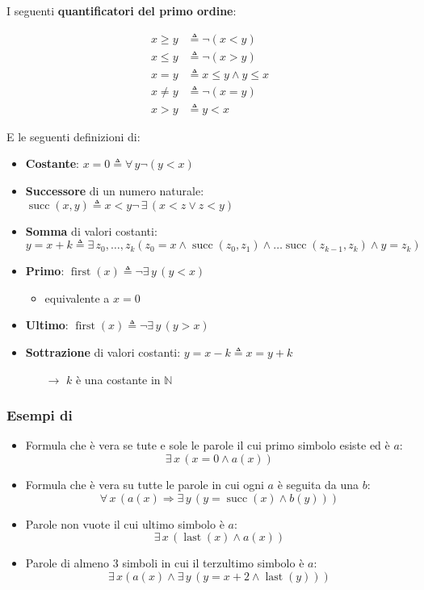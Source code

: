 \documentclass[italian, 10pt]{article}
\DeclareMathOperator{\succop}{succ}
\DeclareMathOperator{\lastop}{last}
\DeclareMathOperator{\firstop}{first}
\begin{document}
I seguenti \textbf{quantificatori del primo ordine}:

\begin{align*}
  x \geq y & \triangleq \lnot (x < y)           \\
  x \leq y & \triangleq \lnot (x > y)           \\
  x = y    & \triangleq x \leq y \land y \leq x \\
  x \neq y & \triangleq \lnot (x = y)           \\
  x > y    & \triangleq y < x
\end{align*}

E le seguenti definizioni di:

\begin{itemize}
  \item \textbf{Costante}: \(x = 0 \triangleq \forall \, y \lnot (y < x)\)
  \item \textbf{Successore} di un numero naturale: \(\succop(x, y) \triangleq x < y \lnot \, \exists \, (x < z \lor z < y)\)
  \item \textbf{Somma} di valori costanti: \(y = x + k \triangleq \exists \, z_0, \ldots, z_k (z_0 = x \land \succop (z_0, z_1) \land \ldots \succop (z_{k-1}, z_k) \land y = z_k) \)
  \item \textbf{Primo}: \(\firstop(x) \triangleq \lnot \exists \, y \, (y < x)\)
        \begin{itemize}
          \item equivalente a \(x = 0\)
        \end{itemize}
  \item \textbf{Ultimo}: \(\firstop(x) \triangleq \lnot \exists \, y \, (y > x)\)
  \item \textbf{Sottrazione} di valori costanti: \(y = x - k \triangleq x = y + k\)
        \begin{itemize}
          \item[\(\rightarrow\)] \(k\) è una costante in \(\mathbb{N}\)
        \end{itemize}
\end{itemize}

\subsubsection{Esempi di \MFO}

\begin{itemize}
  \item Formula che è vera se tute e sole le parole il cui primo simbolo esiste ed è \(a\): \[ \exists \, x \, (x = 0 \land a(x)) \]
  \item Formula che è vera su tutte le parole in cui ogni \(a\) è seguita da una \(b\): \[ \forall \, x \, \left(a(x) \Rightarrow \exists \, y \, (y = \succop(x) \land b(y) ) \right)\]
  \item Parole non vuote il cui ultimo simbolo è \(a\): \[ \exists \, x \, ( \lastop(x) \land a(x) )\]
  \item Parole di almeno \(3\) simboli in cui il terzultimo simbolo è \(a\): \[ \exists \, x \left( a(x) \land \exists \, y \, (y =  x + 2 \land \lastop(y) ) \right) \]
\end{itemize}
\end{document}
